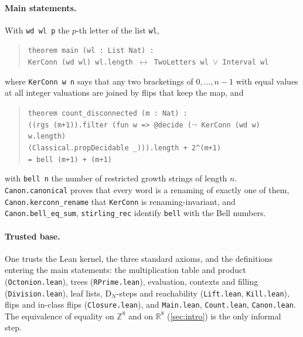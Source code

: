 \documentclass[11pt,a4paper]{article}
\theoremstyle{definition}
\theoremstyle{remark}
\newcommand{\ZZ}{\mathbb{Z}}
\newcommand{\RR}{\mathbb{R}}
\newcommand{\DN}{\mathrm{D}_N}
\newcommand{\lean}[1]{\texttt{#1}}
\begin{document}
\paragraph{Main statements.} With \lean{wd wl p} the $p$-th letter of the list \lean{wl},
\begin{quote}\small
\lean{theorem main (wl : List Nat) :}\\
\hspace*{1.5em}\lean{KerConn (wd wl) wl.length $\leftrightarrow$ TwoLetters wl $\vee$ Interval wl}
\end{quote}
where \lean{KerConn w n} says that any two bracketings of $0,\dots,n-1$ with equal values at all integer
valuations are joined by flips that keep the map, and
\begin{quote}\small
\lean{theorem count\_disconnected (m : Nat) :}\\
\hspace*{1.5em}\lean{((rgs (m+1)).filter (fun w => @decide ($\neg$ KerConn (wd w) w.length)}\\
\hspace*{3em}\lean{(Classical.propDecidable \_))).length + 2\^{}(m+1)}\\
\hspace*{3em}\lean{= bell (m+1) + (m+1)}
\end{quote}
with \lean{bell n} the number of restricted growth strings of length $n$. \lean{Canon.canonical} proves
that every word is a renaming of exactly one of them, \lean{Canon.kerconn\_rename} that \lean{KerConn}
is renaming-invariant, and \lean{Canon.bell\_eq\_sum}, \lean{stirling\_rec} identify \lean{bell} with
the Bell numbers.

\paragraph{Trusted base.} One trusts the Lean kernel, the three standard axioms, and the definitions
entering the main statements: the multiplication table and product (\lean{Octonion.lean}), trees
(\lean{RPrime.lean}), evaluation, contexts and filling (\lean{Division.lean}), leaf lists, $\DN$-steps
and reachability (\lean{Lift.lean}, \lean{Kill.lean}), flips and in-class flips (\lean{Closure.lean}),
and \lean{Main.lean}, \lean{Count.lean}, \lean{Canon.lean}. The equivalence of equality on $\ZZ^8$ and
on $\RR^8$ (\cref{sec:intro}) is the only informal step.
\end{document}
